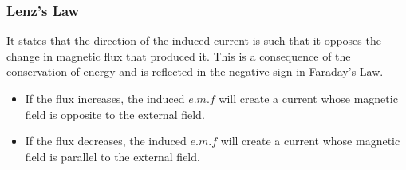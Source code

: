 \subsubsection*{Lenz's Law}
It states that the direction of the induced current is such that it opposes the change in magnetic flux that produced it. This is a consequence of the conservation of energy and is reflected in the negative sign in Faraday's Law.
\begin{itemize}
  \item If the flux increases, the induced $e.m.f$ will create a current whose magnetic field is opposite to the external field. 
  \item If the flux decreases, the induced $e.m.f$ will create a current whose magnetic field is parallel to the external field.
\end{itemize}
